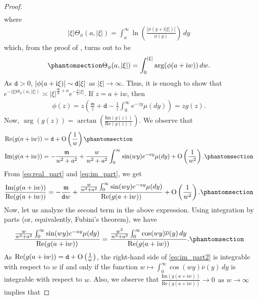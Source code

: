 \documentclass[12pt]{amsart}
\newcommand{\hlabel}{\phantomsection\label}
\numberwithin{equation}{section}
\renewcommand{\Re}{\textrm{Re}}
\renewcommand{\Im}{\textrm{Im}}
\newcommand{\ttt}{\mathtt}
\newcommand{\m}{\mathfrak{m}}
\theoremstyle{definition}
\theoremstyle{assump}
\theoremstyle{remark}
\begin{document}
{\begin{proof}
\begin{align*}
\end{align*}
where
\begin{align*}
|\xi|\Theta_\phi(a,|\xi|)=\int_a^\infty\ln\left(\frac{|\phi(y+\mathrm{i}|\xi|)|}{\phi(y)}\right)\,dy
\end{align*}
which, from the proof of  \cite[Theorem 3.2]{patie2018}, turns out to be
\begin{align}\hlabel{eq:arg}
\Theta_\phi(a,|\xi|)=\int_0^{|\xi|}\arg(\phi(a+\mathrm{i}w))\,dw.
\end{align}
As $\ttt{d}>0$, $|\phi(a+{\rm{i}}\xi)   |\sim \ttt{d}|\xi|$ as $|\xi|\to\infty$. Thus, it is enough to show that $e^{-|\xi|\Theta_\phi(a,|\xi|)}\asymp |\xi|^{\frac{\m}{\ttt{d}}+a}e^{-\frac{\pi}{2}|\xi|}$. If $z=a+\mathrm{i}w$, then
\begin{align*}
\phi(z)=z\left(\frac{\m}{z}+\ttt{d}-\frac{1}{z}\int_0^\infty e^{-zy}\mu(dy)\right)=zg(z).
\end{align*}
Now, $\arg(g(z))=\arctan\left(\frac{\Im(g(z))}{\Re(g(z))}\right)$. We observe that
\begin{align}
\Re(g(a+\mathrm{i}w))&=\ttt{d}+{\rm{O}}\left(\frac{1}{w}\right) \hlabel{eq:real_part}\\
\Im(g(a+\mathrm{i}w))&=-\frac{\m}{w^2+a^2}+\frac{w}{w^2+a^2}\int_0^\infty\sin(wy)e^{-ay}\mu(dy)+{\rm{O}}\left(\frac{1}{w^2}\right). \hlabel{eq:im_part}
\end{align}
From \eqref{eq:real_part} and \eqref{eq:im_part}, we get
\begin{align}
\frac{\Im(g(a+\mathrm{i}w))}{\Re(g(a+\mathrm{i}w))}=-\frac{\m}{\ttt{d}w}+\frac{\frac{w}{w^2+a^2}\int_0^\infty\sin(wy)e^{-ay}\mu(dy)}{\Re(g(a+\mathrm{i}w))}+{\rm{O}}\left(\frac{1}{w^2}\right). \hlabel{eq:ratio_real_im}
\end{align}
Now, let us analyze the second term in the above expression. Using integration by parts (or, equivalently, Fubini's theorem), we have
\begin{align}
\frac{\frac{w}{w^2+a^2}\int_0^\infty\sin(wy)e^{-ay}\mu(dy)}{\Re(g(a+\mathrm{i}w))}=\frac{\frac{w^2}{w^2+a^2}\int_0^\infty\cos(wy)\overline{\nu}(y)\,dy}{\Re(g(a+\mathrm{i}w))}. \hlabel{eq:im_part2}
\end{align}
As $\Re(g(a+\mathrm{i}w))=\ttt{d}+{\rm{O}}\left(\frac{1}{w}\right)$, the right-hand side of \eqref{eq:im_part2} is integrable with respect to $w$ if and only if the function $w\mapsto\int_0^\infty\cos(wy)\overline{\nu}(y)\,dy$ is integrable with respect to $w$. Also, we observe that $\frac{\Im(g(a+\mathrm{i}w))}{\Re(g(a+\mathrm{i}w))}\to 0 \ \ \mbox{as $w\to\infty$}$ implies that

\end{proof}}
\end{document}
